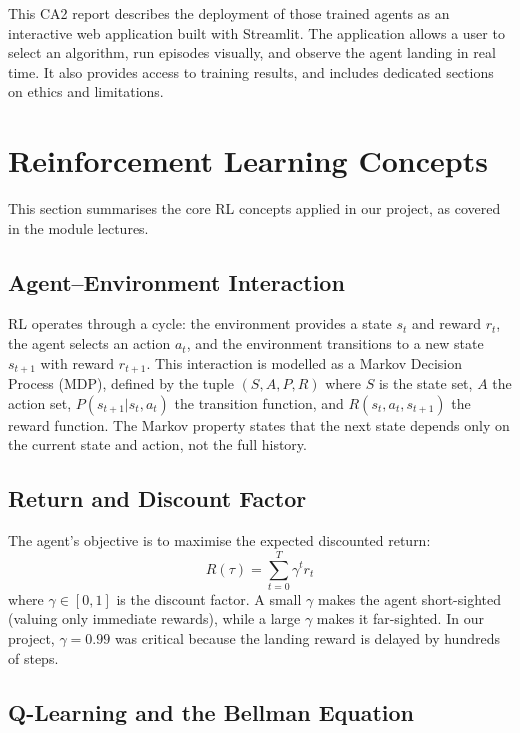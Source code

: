 \documentclass[11pt,a4paper]{article}
\begin{document}
This CA2 report describes the deployment of those trained agents as an interactive web application built with Streamlit. The application allows a user to select an algorithm, run episodes visually, and observe the agent landing in real time. It also provides access to training results, and includes dedicated sections on ethics and limitations.

\section{Reinforcement Learning Concepts}

This section summarises the core RL concepts applied in our project, as covered in the module lectures.

\subsection{Agent--Environment Interaction}

RL operates through a cycle: the environment provides a state $s_t$ and reward $r_t$, the agent selects an action $a_t$, and the environment transitions to a new state $s_{t+1}$ with reward $r_{t+1}$. This interaction is modelled as a Markov Decision Process (MDP), defined by the tuple $(S, A, P, R)$ where $S$ is the state set, $A$ the action set, $P(s_{t+1} | s_t, a_t)$ the transition function, and $R(s_t, a_t, s_{t+1})$ the reward function. The Markov property states that the next state depends only on the current state and action, not the full history.

\subsection{Return and Discount Factor}

The agent's objective is to maximise the expected discounted return:
\begin{equation}
R(\tau) = \sum_{t=0}^{T} \gamma^t r_t
\end{equation}
where $\gamma \in [0,1]$ is the discount factor. A small $\gamma$ makes the agent short-sighted (valuing only immediate rewards), while a large $\gamma$ makes it far-sighted. In our project, $\gamma = 0.99$ was critical because the landing reward is delayed by hundreds of steps.

\subsection{Q-Learning and the Bellman Equation}
\end{document}

